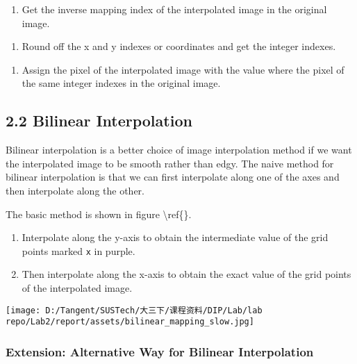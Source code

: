 \documentclass[
]{article}
\begin{document}
\begin{enumerate}
\def\labelenumi{\arabic{enumi}.}
\item
  Get the inverse mapping index of the interpolated image in the
  original image.
\end{enumerate}

\begin{enumerate}
\def\labelenumi{\arabic{enumi}.}
\item
  Round off the x and y indexes or coordinates and get the integer
  indexes.
\end{enumerate}

\begin{enumerate}
\def\labelenumi{\arabic{enumi}.}
\item
  Assign the pixel of the interpolated image with the value where the
  pixel of the same integer indexes in the original image.
\end{enumerate}

\hypertarget{22-bilinear-interpolation}{%
\subsection{2.2 Bilinear
Interpolation}\label{22-bilinear-interpolation}}

Bilinear interpolation is a better choice of image interpolation method
if we want the interpolated image to be smooth rather than edgy. The
naive method for bilinear interpolation is that we can first interpolate
along one of the axes and then interpolate along the other.

The basic method is shown in figure \textbackslash ref\{\}.

\begin{enumerate}
\def\labelenumi{\arabic{enumi}.}
\item
  Interpolate along the y-axis to obtain the intermediate value of the
  grid points marked \texttt{x} in purple.
\item
  Then interpolate along the x-axis to obtain the exact value of the
  grid points of the interpolated image.
\end{enumerate}

\texttt{[image: D:/Tangent/SUSTech/大三下/课程资料/DIP/Lab/lab repo/Lab2/report/assets/bilinear\_mapping\_slow.jpg]}

\hypertarget{extension-alternative-way-for-bilinear-interpolation}{%
\subsubsection{Extension: Alternative Way for Bilinear
Interpolation}\label{extension-alternative-way-for-bilinear-interpolation}}
\end{document}
